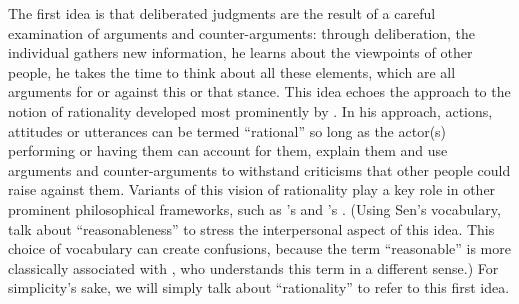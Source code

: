 \documentclass[version=3.21, pagesize, twoside=off, bibliography=totoc, DIV=calc, fontsize=12pt, a4paper, french, english]{scrartcl}
\begin{document}
The first idea is that deliberated judgments are the result of a careful examination of arguments and counter-arguments: through deliberation, the individual gathers new information, he learns about the viewpoints of other people, he takes the time to think about all these elements, which are all arguments for or against this or that stance. 
This idea echoes the approach to the notion of rationality developed most prominently by \citet{habermas_theorie_1981}. 
In his approach, actions, attitudes or utterances can be termed “rational” so long as the actor(s) performing or having them can account for them, explain them and use arguments and counter-arguments to withstand criticisms that other people could raise against them. 
Variants of this vision of rationality play a key role in other prominent philosophical frameworks, such as \citeauthor{scanlon_what_2000}’s \citeyearpar{scanlon_what_2000} and \citeauthor{sen_idea_2009}’s \citeyearpar{sen_idea_2009}. 
(Using Sen's vocabulary, \citeauthor{bartkowski_beyond_2018} talk about ``reasonableness'' to stress the interpersonal aspect of this idea. 
This choice of vocabulary can create confusions, because the term ``reasonable'' is more classically associated with \citet{rawls_political_2005}, who understands this term in a different sense.) 
For simplicity's sake, we will simply talk about ``rationality'' to refer to this first idea.
\end{document}
